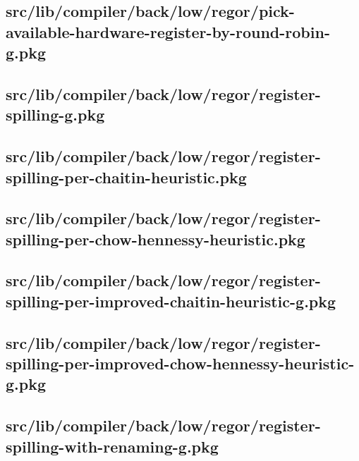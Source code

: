 \subsection{src/lib/compiler/back/low/regor/pick-available-hardware-register-by-round-robin-g.pkg}


\subsection{src/lib/compiler/back/low/regor/register-spilling-g.pkg}


\subsection{src/lib/compiler/back/low/regor/register-spilling-per-chaitin-heuristic.pkg}


\subsection{src/lib/compiler/back/low/regor/register-spilling-per-chow-hennessy-heuristic.pkg}


\subsection{src/lib/compiler/back/low/regor/register-spilling-per-improved-chaitin-heuristic-g.pkg}


\subsection{src/lib/compiler/back/low/regor/register-spilling-per-improved-chow-hennessy-heuristic-g.pkg}


\subsection{src/lib/compiler/back/low/regor/register-spilling-with-renaming-g.pkg}


